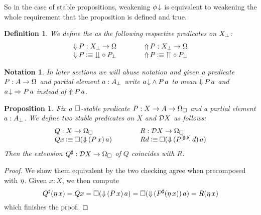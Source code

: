 \documentclass[11pt]{article}
\newtheorem{prop}[thrm]{Proposition}
\newtheorem{defn}[thrm]{Definition}
\newtheorem{nota}[thrm]{Notation}
\begin{document}
So in the case of stable propositions, weakening \({{\phi}\!\downarrow}\) is equivalent
to weakening the whole requirement that the proposition is defined and true.

\begin{defn}
  We define the  as the following respective predicates on
  \({X}_\bot\):
  \[\arraycolsep=2em
    \begin{array}{ll}
      \IParEExt{P} : \IPar{X} \to \IProp
      &
        \IParUExt{P} : \IPar{X} \to \IProp
      \\
      \IParEExt{P} \IsDefined \ISquashSym\circ\IPar{P}
      &
        \IParUExt{P} \IsDefined \ISquishSym\circ\IPar{P}
    \end{array}
  \]
\end{defn}

\begin{nota}
  In later sections we will abuse notation and given a predicate
  \(P : A \to \Omega\) and partial element \(a : {A}_\bot\) write
  \({{{a}\!\downarrow}}\land{P\,a}\) to mean \({\Downarrow}\,{P}\,a\) and
  \({{{a}\!\downarrow}}\Rightarrow{P\,a}\) instead of \({\Uparrow}\,{P}\,a\).
\end{nota}

\begin{prop}\label{prop:boxed-existential-partial-extension}
  Fix a \(\Box\)-stable predicate \(P : X \to A \to \Omega_\Box\)
  and a partial element \(a : {A}_\bot\).
  We define two stable predicates on \(X\) and \(\mathcal{D}{X}\) as follows:
  \[\arraycolsep=2em
    \begin{array}{ll}
      Q:\IFun{X}{\IPropCl}
      &
        R:\IFun{\ISheaf{X}}{\IPropCl}
      \\
      {Qx} \IsDefined {\IBox{(\IParEExt{(P\,x)}\,a)}}
      &
        {Rd} \IsDefined {\IBox{(\IParEExt{(\IRPExt{P}\,d)}\,a)}}
    \end{array}
  \]
  Then the extension \({Q}^\sharp:{{\mathcal{D}{X}}\to{\Omega_\Box}}\) of \(Q\)
  coincides with \(R\).
\end{prop}
\begin{proof}
  We show them equivalent by the two checking agree
  when precomposed with \(\eta\).
  Given \(x : X\), we then compute
  \[
    {Q}^\sharp(\eta\,{x})
    = Qx
    = \Box{({\Downarrow}\,{(P\,x)}\,a)}
    = \Box{({\Downarrow}\,{({P}^\sharp(\eta\,{x}))}\,a)}
    = R(\eta\,{x})
  \]
  which finishes the proof.
\end{proof}
\end{document}
